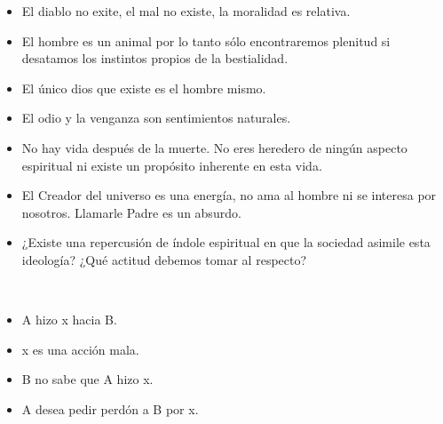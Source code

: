 \begin{itemize}
	\item El diablo no exite, el mal no existe, la moralidad es relativa.
	\item El hombre es un animal por lo tanto sólo encontraremos plenitud si desatamos los instintos propios de la bestialidad.
	\item El único dios que existe es el hombre mismo.
	\item El odio y la venganza son sentimientos naturales.
	\item No hay vida después de la muerte. No eres heredero de ningún aspecto espiritual ni existe un propósito inherente en esta vida.
	\item El Creador del universo es una energía, no ama al hombre ni se interesa por nosotros. Llamarle Padre es un absurdo.
	\item ¿Existe una repercusión de índole espiritual en que la sociedad asimile esta ideología? ¿Qué actitud debemos tomar al respecto?
\end{itemize}
\\[0.5cm
]\begin{itemize}
	\item A hizo x hacia B.
	\item x es una acción mala.
	\item B no sabe que A hizo x.
	\item A desea pedir perdón a B por x.
\end{itemize}

